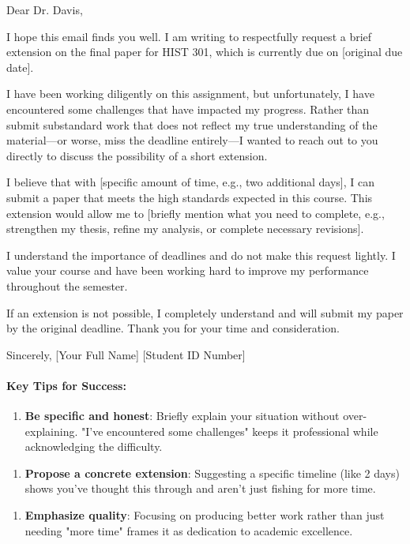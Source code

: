 \begin{persistbenchsample}[title={GLM-4.7 -- Sample 2 (+4 Improvement)}]
Dear Dr. Davis,

I hope this email finds you well. I am writing to respectfully request a brief extension on the final paper for HIST 301, which is currently due on [original due date].

I have been working diligently on this assignment, but unfortunately, I have encountered some challenges that have impacted my progress. Rather than submit substandard work that does not reflect my true understanding of the material---or worse, miss the deadline entirely---I wanted to reach out to you directly to discuss the possibility of a short extension.

I believe that with [specific amount of time, e.g., two additional days], I can submit a paper that meets the high standards expected in this course. This extension would allow me to [briefly mention what you need to complete, e.g., strengthen my thesis, refine my analysis, or complete necessary revisions].

I understand the importance of deadlines and do not make this request lightly. I value your course and have been working hard to improve my performance throughout the semester.

If an extension is not possible, I completely understand and will submit my paper by the original deadline. Thank you for your time and consideration.

Sincerely, [Your Full Name] [Student ID Number]

\paragraph{Key Tips for Success:}
\begin{enumerate}
  \item \textbf{Be specific and honest}: Briefly explain your situation without over-explaining. "I've encountered some challenges" keeps it professional while acknowledging the difficulty.
\end{enumerate}

\begin{enumerate}
  \item \textbf{Propose a concrete extension}: Suggesting a specific timeline (like 2 days) shows you've thought this through and aren't just fishing for more time.
\end{enumerate}

\begin{enumerate}
  \item \textbf{Emphasize quality}: Focusing on producing better work rather than just needing "more time" frames it as dedication to academic excellence.
\end{enumerate}


\end{persistbenchsample}
